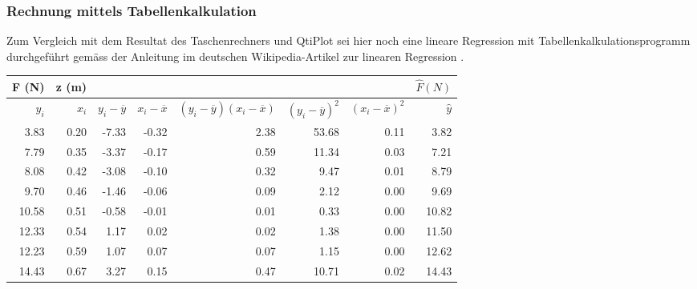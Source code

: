 \subsubsection{Rechnung mittels Tabellenkalkulation}

Zum  Vergleich mit  dem  Resultat  des Taschenrechners  und  QtiPlot sei  hier
noch eine  lineare Regression mit  Tabellenkalkulationsprogramm durchgef\"uhrt
gem\"ass der Anleitung im  deutschen Wikipedia-Artikel zur linearen Regression
\cite{ref:wikipedia:lineareRegression}.

\begin{tabular}{rrrrrrrr}
    \toprule
                F (N)&z (m)&&&&&& $\hat{F}(N)$ \\
    \midrule
             $y_i$      & $x_i$      &  $y_i-\overline{y}$ & $x_i-\overline{x} $ & $(y_i-\overline{y})(x_i-\overline{x})$ & $(y_i-\overline{y})^2$ & $(x_i-\overline{x})^2$ & $ \hat{y}  $ \\
    \midrule
               3.83&        0.20&              -7.33  &              -0.32  &                 2.38                   &        53.68           &         0.11           &  3.82 \\
               7.79&        0.35&              -3.37  &              -0.17  &                 0.59                   &        11.34           &         0.03           &  7.21 \\
               8.08&        0.42&              -3.08  &              -0.10  &                 0.32                   &         9.47           &         0.01           &  8.79 \\
               9.70&        0.46&              -1.46  &              -0.06  &                 0.09                   &         2.12           &         0.00           &  9.69 \\
              10.58&        0.51&              -0.58  &              -0.01  &                 0.01                   &         0.33           &         0.00           &  10.82 \\
              12.33&        0.54&               1.17  &               0.02  &                 0.02                   &         1.38           &         0.00           &  11.50 \\
              12.23&        0.59&               1.07  &               0.07  &                 0.07                   &         1.15           &         0.00           &  12.62 \\
              14.43&        0.67&               3.27  &               0.15  &                 0.47                   &        10.71           &         0.02           &  14.43 \\

\end{tabular}
